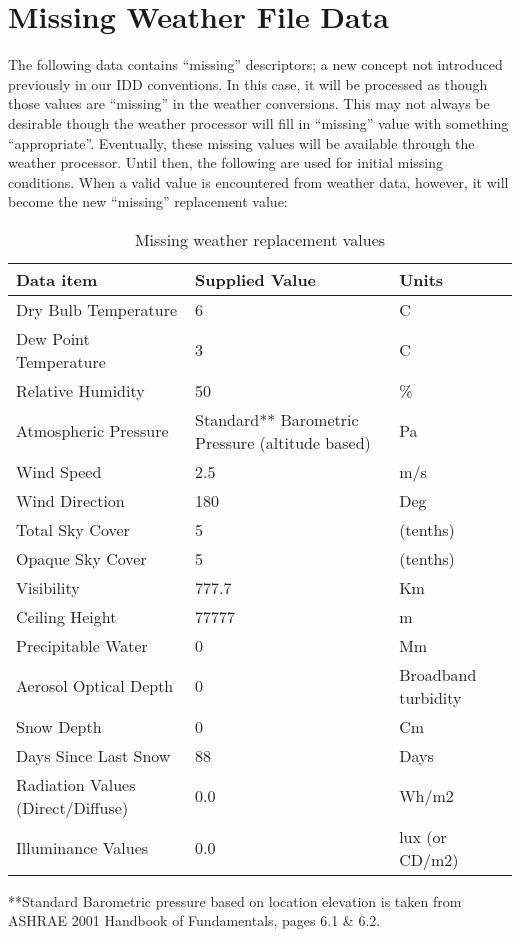\section{Missing Weather File Data}\label{missing-weather-file-data}

The following data contains ``missing'' descriptors; a new concept not introduced previously in our IDD conventions. In this case, it will be processed as though those values are ``missing'' in the weather conversions. This may not always be desirable though the weather processor will fill in ``missing'' value with something ``appropriate''. Eventually, these missing values will be available through the weather processor. Until then, the following are used for initial missing conditions. When a valid value is encountered from weather data, however, it will become the new ``missing'' replacement value:

\begin{longtable}[c]{p{1.83in}p{2.67in}p{1.5in}}
\caption{Missing weather replacement values \protect \label{table:missing-weather-replacement-values}}\\
\toprule 
Data item & Supplied Value & Units \tabularnewline \midrule
\endhead
Dry Bulb Temperature & 6 & C \tabularnewline
Dew Point Temperature & 3 & C \tabularnewline
Relative Humidity & 50 & \% \tabularnewline
Atmospheric Pressure & Standard** Barometric Pressure (altitude based) & Pa \tabularnewline
Wind Speed & 2.5 & m/s \tabularnewline
Wind Direction & 180 & Deg \tabularnewline
Total Sky Cover & 5 & (tenths) \tabularnewline
Opaque Sky Cover & 5 & (tenths) \tabularnewline
Visibility & 777.7 & Km \tabularnewline
Ceiling Height & 77777 & m \tabularnewline
Precipitable Water & 0 & Mm \tabularnewline
Aerosol Optical Depth & 0 & Broadband turbidity \tabularnewline
Snow Depth & 0 & Cm \tabularnewline
Days Since Last Snow & 88 & Days \tabularnewline
Radiation Values (Direct/Diffuse) & 0.0 & Wh/m2 \tabularnewline
Illuminance Values & 0.0 & lux (or CD/m2) \tabularnewline
\bottomrule
\end{longtable}

**Standard Barometric pressure based on location elevation is taken from ASHRAE 2001 Handbook of Fundamentals, pages 6.1 \& 6.2.
